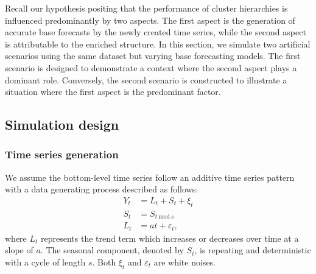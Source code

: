 \documentclass[a4paper,review,12pt,authoryear]{elsarticle}
\begin{document}
Recall our hypothesis positing that the performance of cluster hierarchies is influenced predominantly by two aspects. The first aspect is the generation of accurate base forecasts by the newly created time series, while the second aspect is attributable to the enriched structure. In this section, we simulate two artificial scenarios using the same dataset but varying base forecasting models. The first scenario is designed to demonstrate a context where the second aspect plays a dominant role. Conversely, the second scenario is constructed to illustrate a situation where the first aspect is the predominant factor.  


\subsection{Simulation design}

\subsubsection*{Time series generation}

We assume the bottom-level time series follow an additive time series pattern with a data generating process described as follows:
\begin{equation}
    \label{simu:DGP}
    \begin{aligned}
    Y_t &= L_t + S_t + \xi_t \\
    S_t &= S_{t~\text{mod}~s} \\
    L_t &= a t + \varepsilon_t,
    \end{aligned}
\end{equation}
where $L_t$ represents the trend term which increases or decreases over time at a slope of $a$. The seasonal component, denoted by $S_t$, is repeating and deterministic with a cycle of length $s$. Both $\xi_t$ and $\varepsilon_t$ are white noises.
\end{document}

